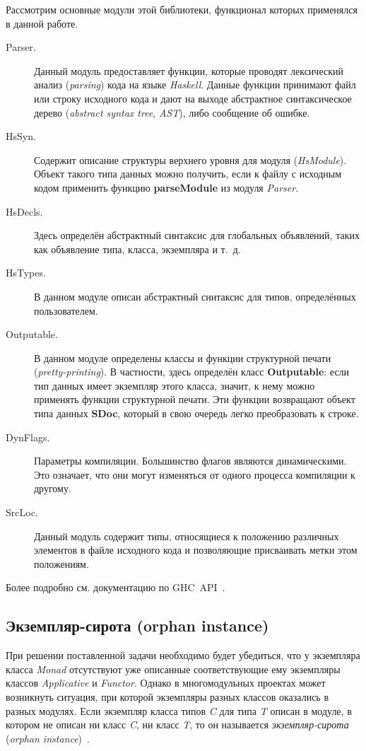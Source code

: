 Рассмотрим основные модули этой библиотеки, функционал которых применялся в данной работе.
\begin{description}
\item[Parser.] Данный модуль предоставляет функции, которые проводят лексический анализ (\textit{parsing}) кода на языке \textit{Haskell}. Данные функции принимают файл или строку исходного кода и дают на выходе абстрактное синтаксическое дерево (\textit{abstract syntax tree}, \textit{AST}), либо сообщение об ошибке.
\item[HsSyn.] Содержит описание структуры верхнего уровня для модуля (\textit{HsModule}). Объект такого типа данных можно получить, если к файлу с исходным кодом применить функцию \textbf{parseModule} из модуля \textit{Parser}.
\item[HsDecls.] Здесь определён абстрактный синтаксис для глобальных объявлений, таких как объявление типа, класса, экземпляра и т.~д.
\item[HsTypes.] В данном модуле описан абстрактный синтаксис для типов, определённых пользователем.
\item[Outputable.] В данном модуле определены классы и функции структурной печати (\textit{pretty-printing}). В частности, здесь определён класс \textbf{Outputable}: если тип данных имеет экземпляр этого класса, значит, к нему можно применять функции структурной печати. Эти функции возвращают объект типа данных \textbf{SDoc}, который в свою очередь легко преобразовать к строке.
\item[DynFlags.] Параметры компиляции. Большинство флагов являются динамическими. Это означает, что они могут изменяться от одного процесса компиляции к другому.
\item[SrcLoc.] Данный модуль содержит типы, относящиеся к положению различных элементов в файле исходного кода и позволяющие присваивать метки этом положениям. 
\end{description}

Более подробно см. документацию по GHC~API~\autocite{apidoc}.

\subsection{Экземпляр-сирота (orphan instance)}
При решении поставленной задачи необходимо будет убедиться, что у экземпляра класса \textit{Monad} отсутствуют уже описанные соответствующие ему экземпляры классов \textit{Applicative} и \textit{Functor}. Однако в многомодульных проектах может возникнуть ситуация, при которой экземпляры разных классов оказались в разных модулях. Если экземпляр класса типов \textit{C} для типа \textit{T} описан в модуле, в котором не описан ни класс \textit{C}, ни класс \textit{T}, то он называется \textit{экземпляр-сирота} (\textit{orphan instance})~\autocite{orphinst}. 

